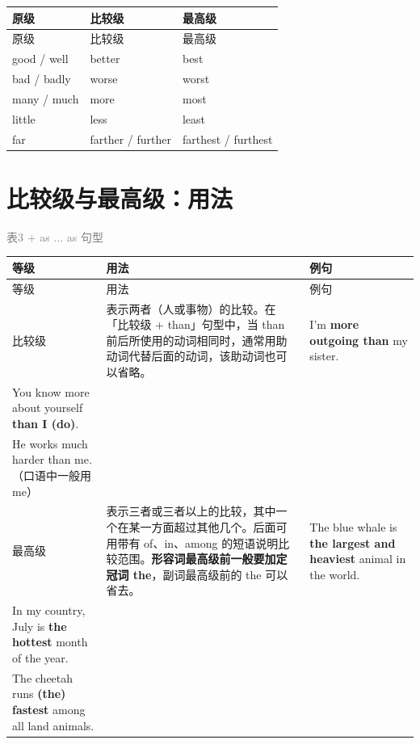 \documentclass[11pt,a4paper]{ctexart}
\begin{document}
{\footnotesize
\begin{longtable}{p{4.47cm}p{4.47cm}p{4.47cm}}
\hline
原级 & 比较级 & 最高级 \\
\hline
\endfirsthead
\hline
原级 & 比较级 & 最高级 \\
\hline
\endhead
\hline
\endfoot
good / well & better & best \\
bad / badly & worse & worst \\
many / much & more & most \\
little & less & least \\
far & farther / further & farthest / furthest \\
\end{longtable}
}

\section{比较级与最高级：用法}
\noindent\textcolor{gray}{表3 + as ... as 句型}\par\smallskip
{\footnotesize
\begin{longtable}{p{4.47cm}p{4.47cm}p{4.47cm}}
\hline
等级 & 用法 & 例句 \\
\hline
\endfirsthead
\hline
等级 & 用法 & 例句 \\
\hline
\endhead
\hline
\endfoot
比较级 & 表示两者（人或事物）的比较。在「比较级 + than」句型中，当 than 前后所使用的动词相同时，通常用助动词代替后面的动词，该助动词也可以省略。 & I’m \textbf{more outgoing than} my sister.\\ You know more about yourself \textbf{than I (do)}.\\ He works much harder than me.（口语中一般用 me） \\
最高级 & 表示三者或三者以上的比较，其中一个在某一方面超过其他几个。后面可用带有 of、in、among 的短语说明比较范围。\textbf{形容词最高级前一般要加定冠词 the}，副词最高级前的 the 可以省去。 & The blue whale is \textbf{the largest and heaviest} animal in the world.\\ In my country, July is \textbf{the hottest} month of the year.\\ The cheetah runs \textbf{(the) fastest} among all land animals. \\
\end{longtable}
}

\begin{center}\end{center}
\end{document}
